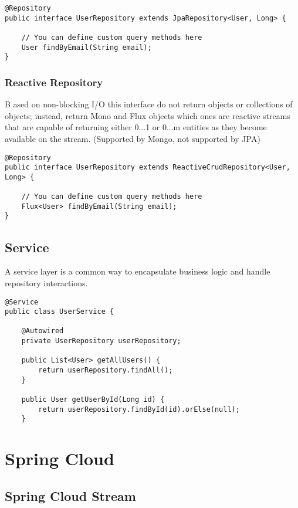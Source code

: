 \documentclass[a4paper, 12pt]{article}
\begin{document}
    \begin{lstlisting}
@Repository
public interface UserRepository extends JpaRepository<User, Long> {

    // You can define custom query methods here
    User findByEmail(String email);
}
    \end{lstlisting}

    \subsubsection{Reactive Repository}
    B ased on non-blocking I/O this interface do not
    return objects or collections of objects; instead, return Mono and Flux objects which ones are reactive streams that are
    capable of returning either 0...1 or 0...m entities as they become available on the stream. (Supported by Mongo, not supported by JPA)
    \begin{lstlisting}
@Repository
public interface UserRepository extends ReactiveCrudRepository<User, Long> {

    // You can define custom query methods here
    Flux<User> findByEmail(String email);
}
    \end{lstlisting}

    \subsection{Service}
    A service layer is a common way to encapsulate business logic and handle repository interactions.
    \begin{lstlisting}
@Service
public class UserService {

    @Autowired
    private UserRepository userRepository;

    public List<User> getAllUsers() {
        return userRepository.findAll();
    }

    public User getUserById(Long id) {
        return userRepository.findById(id).orElse(null);
    }
    \end{lstlisting}

    \newpage


    \section{Spring Cloud}

    \subsection{Spring Cloud Stream}
\end{document}
